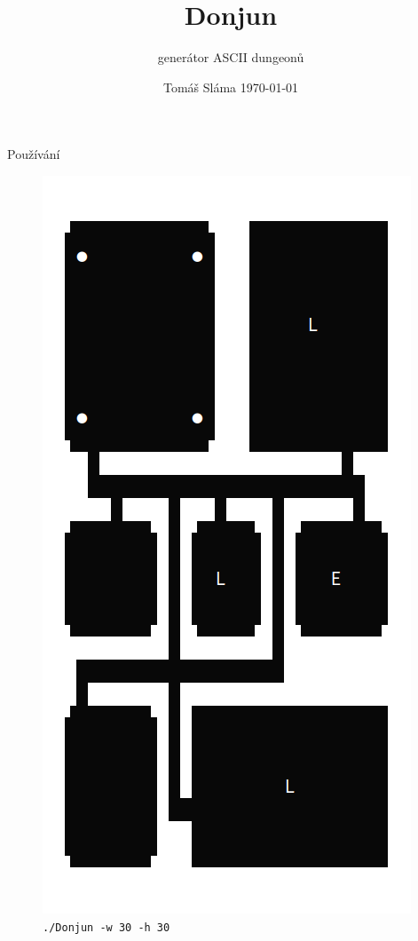 \documentclass[czech]{beamer}
\title{Donjun}
\subtitle{generátor ASCII dungeonů}
\date{Tomáš Sláma \hfill \today}
\begin{document}
	\begin{frame}
		\maketitle
	\end{frame}
	
	\begin{frame}{Používání}
		\begin{figure}
		\centering
		\begin{minipage}{.5\textwidth}
			\centering
			\includegraphics[width=.6\linewidth]{../img/30x30.png}
			\texttt{./Donjun -w 30 -h 30}
		\end{minipage}%
		\begin{minipage}{.5\textwidth}
			\centering

\end{minipage}
\end{figure}
\end{frame}
\end{document}
